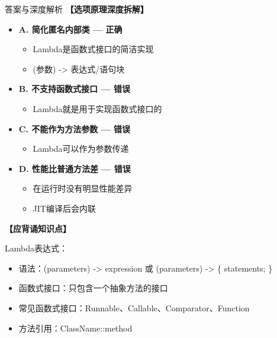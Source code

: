 \documentclass[12pt, a4paper]{ctexart}
\begin{document}
\begin{enumerate}[label=\textbf{\arabic*.}]
\begin{bluebox}{答案与深度解析}
		      \textbf{【选项原理深度拆解】}
					  \begin{itemize}[label={}, leftmargin=*, nosep]

		      
		      \item \textbf{A. 简化匿名内部类 — 正确}
					  \begin{itemize}[label={}, nosep]
		      
			      \item Lambda是函数式接口的简洁实现
			      \item (参数) -> 表达式/语句块
		      

					  \end{itemize}
		      \item \textbf{B. 不支持函数式接口 — 错误}
					  \begin{itemize}[label={}, nosep]
		      
			      \item Lambda就是用于实现函数式接口的
		      

					  \end{itemize}
		      \item \textbf{C. 不能作为方法参数 — 错误}
					  \begin{itemize}[label={}, nosep]
		      
			      \item Lambda可以作为参数传递
		      

					  \end{itemize}
		      \item \textbf{D. 性能比普通方法差 — 错误}
					  \begin{itemize}[label={}, nosep]
		      
			      \item 在运行时没有明显性能差异
			      \item JIT编译后会内联
		      
		      

		      
					  \end{itemize}
					  \end{itemize}
\textbf{【应背诵知识点】}

		      Lambda表达式：
		      \begin{itemize}[label={}, nosep]
			      \item 语法：(parameters) -> expression 或 (parameters) -> \{ statements; \}
			      \item 函数式接口：只包含一个抽象方法的接口
			      \item 常见函数式接口：Runnable、Callable、Comparator、Function
			      \item 方法引用：ClassName::method
		      \end{itemize}
	      \end{bluebox}


\end{enumerate}
\end{document}
